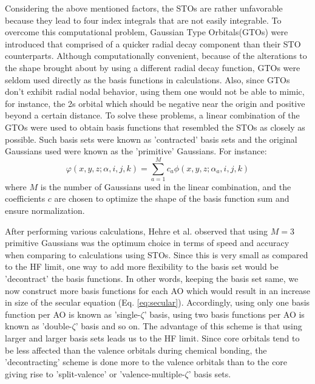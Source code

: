             Considering the above mentioned factors, the STOs are rather unfavorable because they lead to four index integrals that are not easily integrable. To overcome this computational problem, Gaussian Type Orbitals(GTOs) were introduced that comprised of a quicker radial decay component than their STO counterparts. Although computationally convenient, because of the alterations to the shape brought about by using a different radial decay function, GTOs were seldom used directly as the basis functions in calculations. Also, since GTOs don't exhibit radial nodal behavior, using them one would not be able to mimic, for instance, the 2s orbital which should be negative near the origin and positive beyond a certain distance. To solve these problems, a linear combination of the GTOs were used to obtain basis functions that resembled the STOs as closely as possible. Such basis sets were known as 'contracted' basis sets and the original Gaussians used were known as the 'primitive' Gaussians. For instance:
            \begin{equation}\label{eq:contracted}
               \varphi(x, y, z; {\alpha}, i, j, k) = \displaystyle\sum_{a = 1}^M c_a \phi(x, y, z; \alpha_a, i , j, k)
            \end{equation}
            where $M$ is the number of Gaussians used in the linear combination, and the coefficients $c$ are chosen to optimize the shape of the basis function sum and ensure normalization.
            
            After performing various calculations, Hehre et al. \cite{Hehre1969} observed that using $M = 3$ primitive Gaussians was the optimum choice in terms of speed and accuracy when comparing to calculations using STOs. Since this is very small as compared to the HF limit, one way to add more flexibility to the basis set would be 'decontract' the basis functions. In other words, keeping the basis set same, we now construct more basis functions for each AO which would result in an increase in size of the secular equation (Eq. \eqref{eq:secular}). Accordingly, using only one basis function per AO is known as 'single-$\zeta$' basis, using two basis functions per AO is known as 'double-$\zeta$' basis and so on. The advantage of this scheme is that using larger and larger basis sets leads us to the HF limit. Since core orbitals tend to be less affected than the valence orbitals during chemical bonding, the 'decontracting' scheme is done more to the valence orbitals than to the core giving rise to 'split-valence' or 'valence-multiple-$\zeta$' basis sets.

